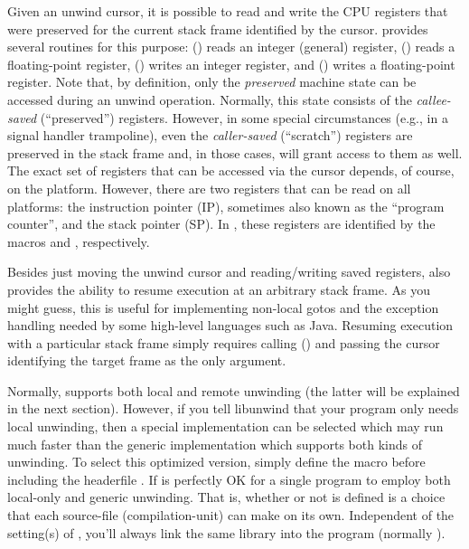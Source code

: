 \documentclass{article}
\begin{document}
Given an unwind cursor, it is possible to read and write the CPU
registers that were preserved for the current stack frame identified
by the cursor.   provides several routines for this
purpose: () reads an integer (general) register,
() reads a floating-point register,
() writes an integer register, and
() writes a floating-point register.  Note that,
by definition, only the \emph{preserved} machine state can be accessed
during an unwind operation.  Normally, this state consists of the
\emph{callee-saved} (``preserved'') registers.  However, in some
special circumstances (e.g., in a signal handler trampoline), even the
\emph{caller-saved} (``scratch'') registers are preserved in the stack
frame and, in those cases,  will grant access to them
as well.  The exact set of registers that can be accessed via the
cursor depends, of course, on the platform.  However, there are two
registers that can be read on all platforms: the instruction pointer
(IP), sometimes also known as the ``program counter'', and the stack
pointer (SP).  In , these registers are identified by
the macros  and ,
respectively.

Besides just moving the unwind cursor and reading/writing saved
registers,  also provides the ability to resume
execution at an arbitrary stack frame.  As you might guess, this is
useful for implementing non-local gotos and the exception handling
needed by some high-level languages such as Java.  Resuming execution
with a particular stack frame simply requires calling
() and passing the cursor identifying the target
frame as the only argument.

Normally,  supports both local and remote unwinding
(the latter will be explained in the next section).  However, if you
tell libunwind that your program only needs local unwinding, then a
special implementation can be selected which may run much faster than
the generic implementation which supports both kinds of unwinding.  To
select this optimized version, simply define the macro
 before including the headerfile
.  If is perfectly OK for a single program to
employ both local-only and generic unwinding.  That is, whether or not
 is defined is a choice that each source-file
(compilation-unit) can make on its own.  Independent of the setting(s)
of , you'll always link the same library into
the program (normally ).
\end{document}
